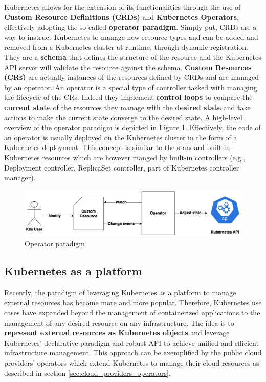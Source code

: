 
Kubernetes allows for the extension of its functionalities through the use of \textbf{Custom Resource Definitions (CRDs)} and \textbf{Kubernetes Operators}, effectively adopting the so-called \textbf{operator paradigm}.
Simply put, CRDs are a way to instruct Kubernetes to manage new resource types and can be added and removed from a Kubernetes cluster at runtime, through dynamic registration.
They are a \textbf{schema} that defines the structure of the resource and the Kubernetes API server will validate the resource against the schema.
\textbf{Custom Resources (CRs)} are actually instances of the resources defined by CRDs and are managed by an operator.
An operator is a special type of controller tasked with managing the lifecycle of the CRs.
Indeed they implement \textbf{control loops} to compare the \textbf{current state} of the resources they manage with the \textbf{desired state} and take actions to make the current state converge to the desired state.
A high-level overview of the operator paradigm is depicted in Figure \ref{fig:operator_paradigm}.
Effectively, the code of an operator is usually deployed on the Kubernetes cluster in the form of a Kubernetes deployment.
This concept is similar to the standard built-in Kubernetes resources which are however manged by built-in controllers (e.g., Deployment controller, ReplicaSet controller, part of Kubernetes controller manager).

\begin{figure}[t]
    \centering
    \includegraphics[width=1\linewidth]{images/opeartor_paradigm.png}
    \caption{Operator paradigm}
    \label{fig:operator_paradigm}
\end{figure}

\subsection{Kubernetes as a platform}

Recently, the paradigm of leveraging Kubernetes as a platform to manage external resources has become more and more popular.
Therefore, Kubernetes use cases have expanded beyond the management of containerized applications to the management of any desired resource on any infrastructure.
The idea is to \textbf{represent external resources as Kubernetes objects} and leverage Kubernetes' declarative paradigm and robust API to achieve unified and efficient infrastructure management.
This approach can be exemplified by the public cloud providers' operators which extend Kubernetes to manage their cloud resources as described in section \ref{sec:cloud_providers_operators}.

